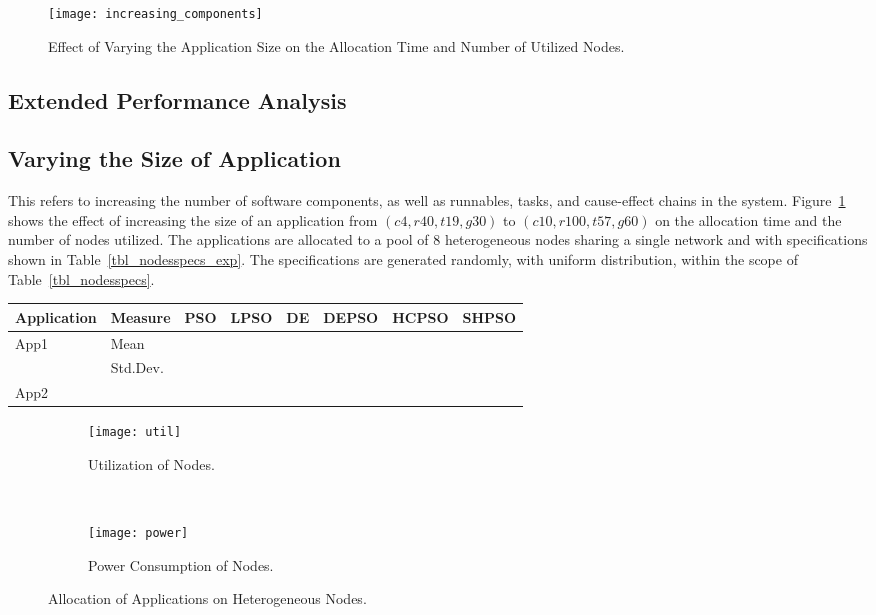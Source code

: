 \begin{figure}[t!]
\centering
\texttt{[image: increasing\_components]}
\caption{Effect of Varying the Application Size on the Allocation Time and Number of Utilized Nodes.}
\label{fig_increasing_components}
\end{figure}



\subsection{Extended Performance Analysis}
\subsection{Varying the Size of Application} 
This refers to increasing the number of software components, as well as runnables, tasks, and cause-effect chains in the system. Figure~\ref{fig_increasing_components} shows the effect of increasing the size of an application from $(c4,r40,t19,g30)$ to $(c10,r100,t57,g60)$ on the allocation time and  the number of nodes utilized. The applications are allocated to a pool of 8 heterogeneous nodes sharing a single network and with specifications shown in Table~\ref{tbl_nodesspecs_exp}. The specifications are generated randomly, with uniform distribution, within the scope of Table~\ref{tbl_nodesspecs}.
\begin{table}[]
\small
\begin{tabular}{@{}llllllll@{}}
\toprule
Application & Measure & PSO & LPSO & DE & DEPSO & HCPSO & SHPSO \\ \midrule
App1 & Mean &  &  &  &  &  &  \\
 & Std.Dev. &  &  &  &  &  &  \\
App2 &  &  &  &  &  &  &  \\ \bottomrule
\end{tabular}
\end{table}

\begin{figure}
    \centering
    \begin{subfigure}[b]{0.4  \textwidth}
        \texttt{[image: util]}
        \caption{Utilization of Nodes.}
        \label{fig_util}
    \end{subfigure}
    ~%
        \begin{subfigure}[b]{0.4\textwidth}
        \texttt{[image: power]}
        \caption{Power Consumption of Nodes.}
        \label{fig_power}
    \end{subfigure}
    \caption{Allocation of Applications on Heterogeneous Nodes.}
    \label{fig_util_power}\vspace{-0.2cm}
\end{figure}

